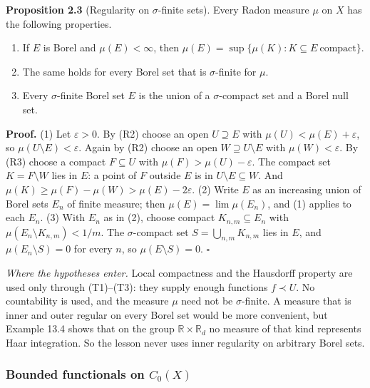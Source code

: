 \documentclass[
  english,
  11pt,
  a4paper,
]{article}
\providecommand{\tightlist}{%
  \setlength{\itemsep}{0pt}\setlength{\parskip}{0pt}}
\begin{document}
\textbf{Proposition 2.3} (Regularity on \(\sigma\)-finite sets). Every
Radon measure \(\mu\) on \(X\) has the following properties.

\begin{enumerate}
\tightlist
\item
  If \(E\) is Borel and \(\mu(E)<\infty\), then
  \(\mu(E)=\sup\{\mu(K):K\subseteq E\ \text{compact}\}\).
\item
  The same holds for every Borel set that is \(\sigma\)-finite for
  \(\mu\).
\item
  Every \(\sigma\)-finite Borel set \(E\) is the union of a
  \(\sigma\)-compact set and a Borel null set.
\end{enumerate}

\textbf{Proof.} (1) Let \(\varepsilon>0\). By (R2) choose an open
\(U\supseteq E\) with \(\mu(U)<\mu(E)+\varepsilon\), so
\(\mu(U\setminus E)<\varepsilon\). Again by (R2) choose an open
\(W\supseteq U\setminus E\) with \(\mu(W)<\varepsilon\). By (R3) choose
a compact \(F\subseteq U\) with \(\mu(F)>\mu(U)-\varepsilon\). The
compact set \(K=F\setminus W\) lies in \(E\): a point of \(F\) outside
\(E\) is in \(U\setminus E\subseteq W\). And
\(\mu(K)\geq\mu(F)-\mu(W)>\mu(E)-2\varepsilon\). (2) Write \(E\) as an
increasing union of Borel sets \(E_n\) of finite measure; then
\(\mu(E)=\lim\mu(E_n)\), and (1) applies to each \(E_n\). (3) With
\(E_n\) as in (2), choose compact \(K_{n,m}\subseteq E_n\) with
\(\mu(E_n\setminus K_{n,m})<1/m\). The \(\sigma\)-compact set
\(S=\bigcup_{n,m}K_{n,m}\) lies in \(E\), and \(\mu(E_n\setminus S)=0\)
for every \(n\), so \(\mu(E\setminus S)=0\). \(\square\)

\emph{Where the hypotheses enter.} Local compactness and the Hausdorff
property are used only through (T1)--(T3): they supply enough functions
\(f\prec U\). No countability is used, and the measure \(\mu\) need not
be \(\sigma\)-finite. A measure that is inner and outer regular on every
Borel set would be more convenient, but Example 13.4 shows that on the
group \(\mathbb R\times\mathbb R_d\) no measure of that kind represents
Haar integration. So the lesson never uses inner regularity on arbitrary
Borel sets.

\subsubsection{\texorpdfstring{Bounded functionals on
\(C_0(X)\)}{Bounded functionals on C\_0(X)}}\label{haar-measure-on-locally-compact-groups--bounded-functionals-on-c_0-x}
\end{document}
